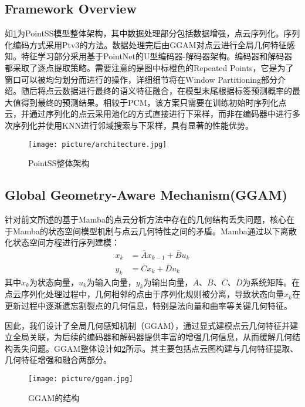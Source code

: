 \documentclass[preprint,12pt]{elsarticle}
\begin{document}
\subsection{ Framework Overview}
如\cref{fig:architecture}为PointSS模型整体架构，其中数据处理部分包括数据增强，点云序列化。序列化编码方式采用Ptv3\cite{ptv3}的方法。数据处理完后由GGAM对点云进行全局几何特征感知。特征学习部分采用基于PointNet的U型编码器-解码器架构。编码器和解码器都采取了逐点提取策略。需要注意的是图中标橙色的Repeated Points，它是为了窗口可以被均匀划分而进行的操作，详细细节将在Window Partitioning部分介绍。随后将点云数据进行最终的语义特征融合，在模型末尾根据标签预测概率的最大值得到最终的预测结果。相较于PCM，该方案只需要在训练初始时序列化点云，并通过序列化的点云采用池化的方式直接进行下采样，而非在编码器中进行多次序列化并使用KNN进行邻域搜索与下采样，具有显著的性能优势。
\begin{figure}[htbp]
	\centering
	\texttt{[image: picture/architecture.jpg]}
	\caption{PointSS整体架构}
	\label{fig:architecture}
\end{figure}


\subsection{Global Geometry-Aware Mechanism(GGAM)}


针对前文所述的基于Mamba的点云分析方法中存在的几何结构丢失问题，核心在于Mamba的状态空间模型机制与点云几何特性之间的矛盾。Mamba通过以下离散化状态空间方程进行序列建模：
\begin{equation}
\begin{aligned}
x_{k} &= \overline{A}x_{k-1} + \overline{B}u_{k} \\
y_{k} &= \overline{C}x_{k} + \overline{D}u_{k}
\end{aligned}
\end{equation}
其中$x_k$为状态向量，$u_k$为输入向量，$y_k$为输出向量，$\overline{A}$、$\overline{B}$、$\overline{C}$、$\overline{D}$为系统矩阵。在点云序列化处理过程中，几何相邻的点由于序列化规则被分离，导致状态向量$x_k$在更新过程中逐渐遗忘割裂点的几何信息，特别是法向量和曲率等关键几何特征。

因此，我们设计了全局几何感知机制（GGAM），通过显式建模点云几何特征并建立全局关联，为后续的编码器和解码器提供丰富的增强几何信息，从而缓解几何结构丢失问题。GGAM整体设计如\cref{fig:ggam}所示。其主要包括点云图构建与几何特征提取、几何特征增强和融合两部分。
\begin{figure}[htbp]
	\centering
	\texttt{[image: picture/ggam.jpg]}
	\caption{GGAM的结构}
	\label{fig:ggam}
\end{figure}
\end{document}
